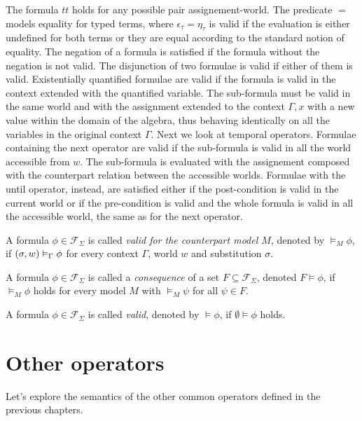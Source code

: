 The formula $tt$ holds for any possible pair assignement-world. The predicate $=$ models equality for typed terms, where
$\epsilon_\tau = \eta_\tau$ is valid if the evaluation is either undefined for both terms or they are equal according to
the standard notion of equality. The negation of a formula is satisfied if the formula without the negation is not
valid. The disjunction of two formulae is valid if either of them is valid. Existentially quantified formulae are valid
if the formula is valid in the context extended with the quantified variable. The sub-formula must be valid in the same
world and with the assignment extended to the context $\Gamma, x$ with a new value within the domain of the algebra,
thus behaving identically on all the variables in the original context $\Gamma$. Next we look at temporal operators.
Formulae containing the next operator are valid if the sub-formula is valid in all the world accessible from $w$. The
sub-formula is evaluated with the assignement composed with the counterpart relation between the accessible worlds.
Formulae with the until operator, instead, are satisfied either if the post-condition is valid in the current world or 
if the pre-condition is valid and the whole formula is valid in all the accessible world, the same as for the next
operator.

\begin{definition}
  A formula $\phi \in \mathcal{F}_\Sigma$ is called \emph{valid for the counterpart model $M$}, denoted by $\vDash_M
  \phi$, if $({\sigma}, {w}) \vDash_{\Gamma} {\phi}$ for every context $\Gamma$, world $w$ and substitution $\sigma$.
\end{definition}
\begin{definition}
  A formula $\phi \in \mathcal{F}_\Sigma$ is called a \emph{consequence} of a set $F \subseteq \mathcal{F}_\Sigma$,
  denoted $F \vDash \phi$, if $\vDash_M \phi$ holds for every model $M$ with $\vDash_M \psi$ for all $\psi \in F$.
\begin{definition}
\end{definition}
  A formula $\phi \in \mathcal{F}_\Sigma$ is called \emph{valid}, denoted by $\vDash \phi$, if $\emptyset \vDash \phi$
  holds.
\end{definition}

\section{Other operators}
Let's explore the semantics of the other common operators defined in the previous chapters.

